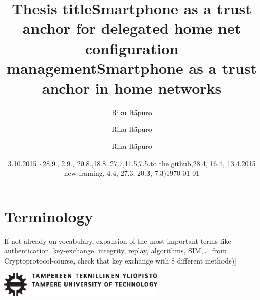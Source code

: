 \documentclass[12pt,a4paper,english]{tutthesis}
\author{Riku Itäpuro}
\title{Thesis title}      %
\author{Riku Itäpuro}
\title{Smartphone as a trust anchor for delegated home net configuration management}
\author{Riku Itäpuro}
\date{3.10.2015 \{28.9., 2.9., 20.8.,18.8.,27.7,11.5,7.5.to the github,28.4, 16.4, 13.4.2015 new-framing, 4.4, 27.3,  20.3, 7.3)}
\title{Smartphone as a trust anchor in home networks}
\begin{document}
\maketitle



\chapter*{Terminology}
\markboth{}{}                                %

If not already on vocabulary, expansion of the most important terms like
authentication, key-exchange, integrity, replay, algorithms, SIM,\ldots{}
[from Cryptoprotocol-course, check that key exchange with 8 different methods)]

\newpage             %

 \pagestyle{headings}
 \thispagestyle{empty}
\date\today
 \vspace*{-.5cm}\noindent
 \includegraphics[width=8cm]{tty_tut_logo}   %

\vspace{6.8cm}
\maketitle
\vspace{6.7cm} %
\end{document}

